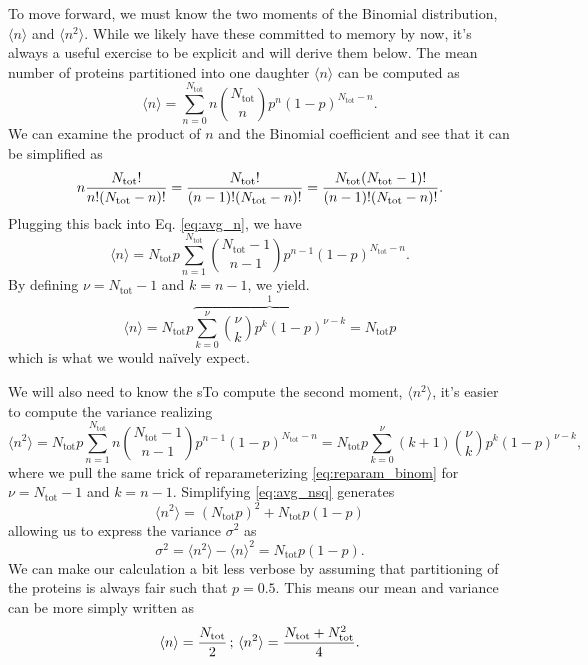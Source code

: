 To move forward, we must know the two moments of the Binomial distribution, $\langle n \rangle$ and $\langle n^2 \rangle$. While we likely have these committed to memory by now, it's always
a useful exercise to be explicit and will derive them below. The mean number of proteins partitioned into one daughter $\langle n \rangle$ can be computed as
\begin{equation}
\langle n \rangle = \sum\limits_{n = 0}^{N_\text{tot}}n{{N_\text{tot}}\choose{n}}p^{n}(1-p)^{N_\text{tot} - n}.
\label{eq:avg_n}
\end{equation}
We can examine the product of $n$ and the Binomial coefficient and see that it can be simplified as
\begin{equation}
n {N_\text{tot}! \over n!(N_\text{tot} - n)!} = {N_\text{tot}! \over (n-1)!(N_\text{tot} - n)!} = {N_\text{tot}(N_\text{tot} - 1)! \over (n - 1)!(N_\text{tot} - n)!}.
\label{eq:expanded_binom}
\end{equation}
Plugging this back into Eq. \ref{eq:avg_n}, we have
\begin{equation}
\langle n \rangle = N_\text{tot} p \sum\limits_{n= 1}^{N_\text{tot}}{{N_\text{tot} - 1}\choose{n - 1}}p^{n - 1}(1 - p)^{N_\text{tot} - n}.
\end{equation}
By defining $\nu = N_\text{tot} - 1$ and $k = n - 1$, we yield.
\begin{equation}
\langle n \rangle = N_\text{tot} p \overbrace{\sum\limits_{k= 0}^{\nu}{{\nu}\choose{k}}p^k(1 - p)^{\nu - k}}^\text{1} = N_\text{tot} p
\label{eq:reparam_binom}
\end{equation}
which is what we would naïvely expect.


We will also need to know the sTo compute the second moment, $\langle n^2 \rangle$, it's easier to compute
the variance
realizing
\begin{equation}
\langle n^2 \rangle = N_\text{tot}p\sum\limits_{n=1}^{N_\text{tot}}n{{N_\text{tot} - 1}\choose{n -1}}p^{n-1}(1 - p)^{N_\text{tot} - n} = N_\text{tot}p\sum\limits_{k=0}^\nu(k + 1){{\nu}\choose{k}}p^k(1-p)^{\nu - k}  \tag{14},
\label{eq:avg_nsq}
\end{equation}
where we pull the same trick of reparameterizing \ref{eq:reparam_binom} for $\nu = N_\text{tot} - 1$ and $k = n - 1$. Simplifying \ref{eq:avg_nsq} generates
\begin{equation}
\langle n^2 \rangle = (N_\text{tot}p)^2 + N_\text{tot}p(1 - p) \tag{15}
\end{equation}
allowing us to express the variance $\sigma^2$ as
\begin{equation}
\sigma^2 = \langle n^2 \rangle - \langle n \rangle^2 = N_\text{tot}p(1 - p).
\end{equation}
We can make our calculation a bit less verbose by assuming that partitioning
of the proteins is always fair such that $p = 0.5$. This means our mean and
variance can be more simply written as
\begin{equation}
\langle n \rangle = {N_\text{tot} \over 2}\, ; \, \langle n^2 \rangle= {N_\text{tot}+ N_\text{tot}^2 \over 4}.
\label{eq:mean_var}
\end{equation}

